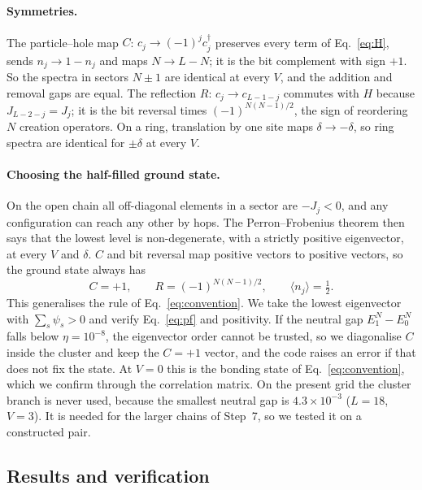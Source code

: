 \documentclass[11pt,a4paper]{article}
\newcommand{\dg}{^{\dagger}}
\begin{document}
\paragraph{Symmetries.}
The particle--hole map $C$: $c_j\to(-1)^jc_j\dg$ preserves every term of Eq.~\eqref{eq:H}, sends $n_j\to1-n_j$ and maps $N\to L-N$; it is the bit complement with sign $+1$.
So the spectra in sectors $N\pm1$ are identical at every $V$, and the addition and removal gaps are equal.
The reflection $R$: $c_j\to c_{L-1-j}$ commutes with $H$ because $J_{L-2-j}=J_j$; it is the bit reversal times $(-1)^{N(N-1)/2}$, the sign of reordering $N$ creation operators.
On a ring, translation by one site maps $\delta\to-\delta$, so ring spectra are identical for $\pm\delta$ at every $V$.

\paragraph{Choosing the half-filled ground state.}
On the open chain all off-diagonal elements in a sector are $-J_j<0$, and any configuration can reach any other by hops.
The Perron--Frobenius theorem then says that the lowest level is non-degenerate, with a strictly positive eigenvector, at every $V$ and $\delta$.
$C$ and bit reversal map positive vectors to positive vectors, so the ground state always has
\begin{equation}
  C=+1,\qquad R=(-1)^{N(N-1)/2},\qquad \langle n_j\rangle=\tfrac12 .
  \label{eq:pf}
\end{equation}
This generalises the rule of Eq.~\eqref{eq:convention}.
We take the lowest eigenvector with $\sum_s\psi_s>0$ and verify Eq.~\eqref{eq:pf} and positivity.
If the neutral gap $E_1^N-E_0^N$ falls below $\eta=10^{-8}$, the eigenvector order cannot be trusted, so we diagonalise $C$ inside the cluster and keep the $C=+1$ vector, and the code raises an error if that does not fix the state.
At $V=0$ this is the bonding state of Eq.~\eqref{eq:convention}, which we confirm through the correlation matrix.
On the present grid the cluster branch is never used, because the smallest neutral gap is $4.3\times10^{-3}$ ($L=18$, $V=3$).
It is needed for the larger chains of Step~7, so we tested it on a constructed pair.

\subsection{Results and verification}
\end{document}
